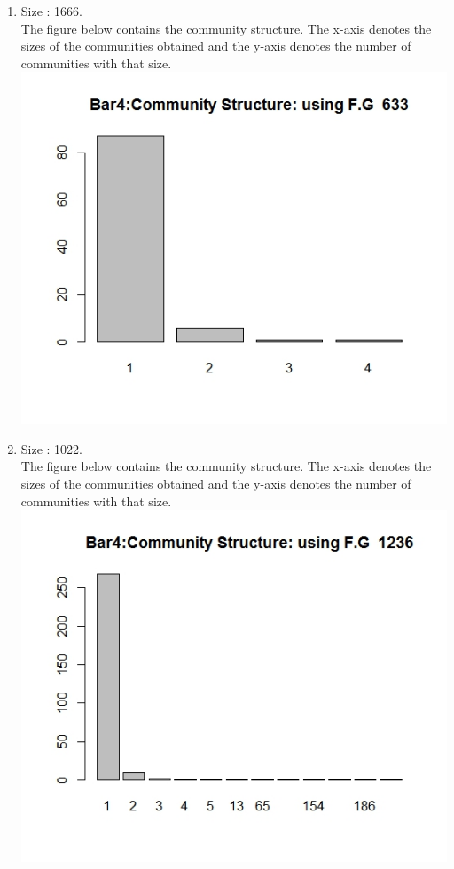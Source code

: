 \documentclass{article}
\begin{document}
\begin{enumerate}
 \item 
 Size : 1666.\\
 The figure below contains the community structure. The x-axis denotes the sizes of the communities obtained
 and the y-axis denotes the number of communities with that size.\\
 \includegraphics[scale=0.4]{p9}
 
 \item 
 Size : 1022.\\
 The figure below contains the community structure. The x-axis denotes the sizes of the communities obtained
 and the y-axis denotes the number of communities with that size.\\
 \includegraphics[scale=0.4]{p10}
 

\end{enumerate}
\end{document}
